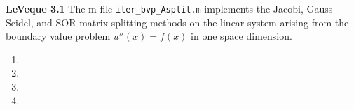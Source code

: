 \textbf{LeVeque 3.1} The m-file \texttt{iter\_bvp\_Asplit.m} implements the Jacobi, Gauss-Seidel, and SOR matrix splitting
methods on the linear system arising from the boundary value problem $u''(x) = f(x)$ in one space dimension.

\begin{enumerate}
  \item 
  \pagebreak
  \item 
  \pagebreak
  \item 
  \pagebreak
  \item 
\end{enumerate} 